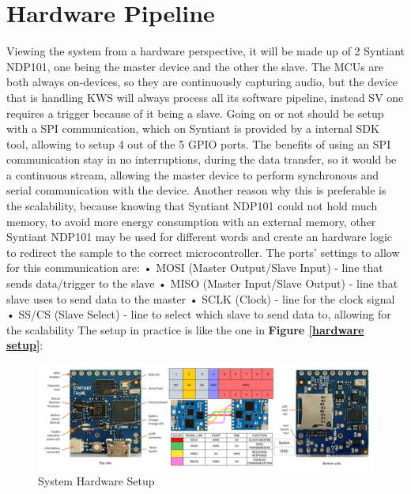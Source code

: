 \section{Hardware Pipeline}
\label{sec:hw pipeline}
Viewing the system from a hardware perspective, it will be made up of 2 Syntiant NDP101, one being the master device and the other the slave. The MCUs are both always on-devices, so they are continuously capturing audio, but the device that is handling KWS will always process all its software pipeline, instead SV one requires a trigger because of it being a slave. Going on or not should be setup with a SPI communication, which on Syntiant is provided by a internal SDK tool, allowing to setup 4 out of the 5 GPIO ports. The benefits of using an SPI communication stay in no interruptions, during the data transfer, so it would be a continuous stream, allowing the master device to perform synchronous and serial communication with the device. Another reason why this is preferable is the scalability, because knowing that Syntiant NDP101 could not hold much memory, to avoid more energy consumption with an external memory, other Syntiant NDP101 may be used for different words and create an hardware logic to redirect the sample to the correct microcontroller. The ports' settings to allow for this communication are:\newline
• MOSI (Master Output/Slave Input) - line that sends data/trigger to the slave\newline
• MISO (Master Input/Slave Output) - line that slave uses to send data to the master\newline
• SCLK (Clock) - line for the clock signal\newline 
• SS/CS (Slave Select) - line to select which slave to send data to, allowing for the scalability\newline
The setup in practice is like the one in \textbf{Figure \ref{hardware setup}}:\newline
\begin{center}
    \centering
    \begin{figure}[!h]
        \includegraphics[width=1.0\textwidth]{images/4.05 Hardware Pipeline 2 NDP101.png}
        \caption{System Hardware Setup}
        \label{fig:hardware setup}
    \end{figure}
\end{center}
